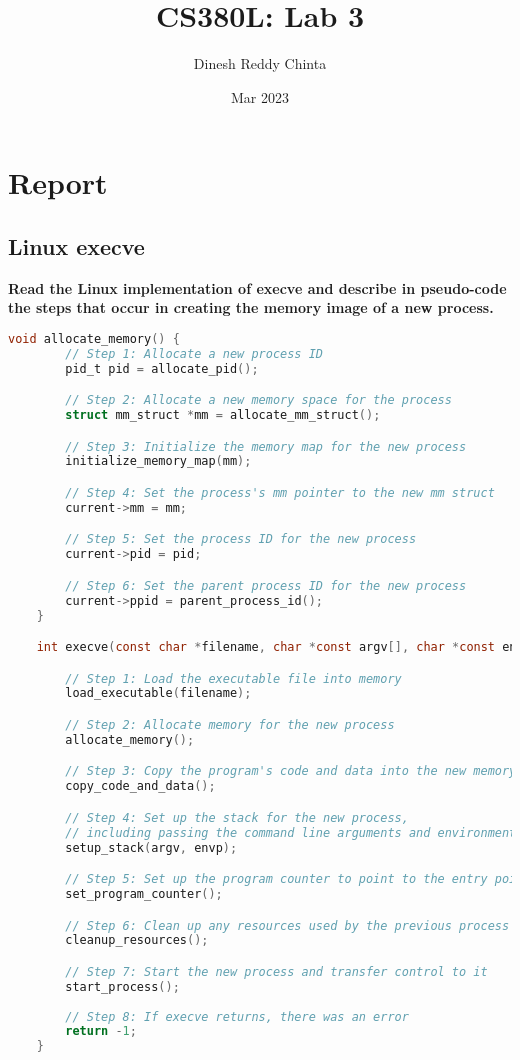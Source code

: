 \documentclass{article}
\title{CS380L: Lab 3}
\author{Dinesh Reddy Chinta}
\date{Mar 2023}
\begin{document}
\maketitle
\section{Report}
\subsection{Linux execve}

\textbf{Read the Linux implementation of execve and describe in pseudo-code the steps that occur in creating the memory image of a new process.}

\begin{lstlisting}[language=C, caption=execve pseudocode, basicstyle=\tiny]
    void allocate_memory() {
        // Step 1: Allocate a new process ID
        pid_t pid = allocate_pid();

        // Step 2: Allocate a new memory space for the process
        struct mm_struct *mm = allocate_mm_struct();

        // Step 3: Initialize the memory map for the new process
        initialize_memory_map(mm);

        // Step 4: Set the process's mm pointer to the new mm struct
        current->mm = mm;

        // Step 5: Set the process ID for the new process
        current->pid = pid;

        // Step 6: Set the parent process ID for the new process
        current->ppid = parent_process_id();
    }

    int execve(const char *filename, char *const argv[], char *const envp[]) {

        // Step 1: Load the executable file into memory
        load_executable(filename);

        // Step 2: Allocate memory for the new process
        allocate_memory();

        // Step 3: Copy the program's code and data into the new memory space
        copy_code_and_data();

        // Step 4: Set up the stack for the new process, 
        // including passing the command line arguments and environment variables.
        setup_stack(argv, envp);

        // Step 5: Set up the program counter to point to the entry point of the program
        set_program_counter();

        // Step 6: Clean up any resources used by the previous process
        cleanup_resources();

        // Step 7: Start the new process and transfer control to it
        start_process();
        
        // Step 8: If execve returns, there was an error
        return -1;
    }
\end{lstlisting}
\end{document}

